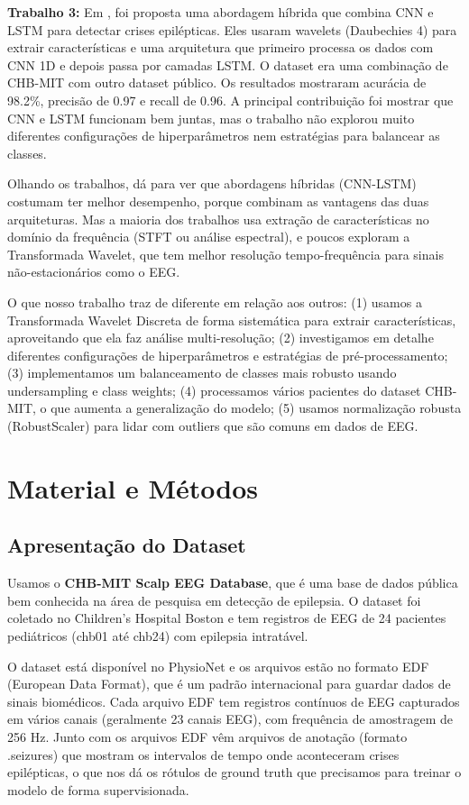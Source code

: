 \documentclass[12pt,a4paper]{article}
\begin{document}
\textbf{Trabalho 3:} Em \cite{sharma2022}, foi proposta uma abordagem híbrida que combina CNN e LSTM para detectar crises epilépticas. Eles usaram wavelets (Daubechies 4) para extrair características e uma arquitetura que primeiro processa os dados com CNN 1D e depois passa por camadas LSTM. O dataset era uma combinação de CHB-MIT com outro dataset público. Os resultados mostraram acurácia de 98.2\%, precisão de 0.97 e recall de 0.96. A principal contribuição foi mostrar que CNN e LSTM funcionam bem juntas, mas o trabalho não explorou muito diferentes configurações de hiperparâmetros nem estratégias para balancear as classes.

Olhando os trabalhos, dá para ver que abordagens híbridas (CNN-LSTM) costumam ter melhor desempenho, porque combinam as vantagens das duas arquiteturas. Mas a maioria dos trabalhos usa extração de características no domínio da frequência (STFT ou análise espectral), e poucos exploram a Transformada Wavelet, que tem melhor resolução tempo-frequência para sinais não-estacionários como o EEG.

O que nosso trabalho traz de diferente em relação aos outros: (1) usamos a Transformada Wavelet Discreta de forma sistemática para extrair características, aproveitando que ela faz análise multi-resolução; (2) investigamos em detalhe diferentes configurações de hiperparâmetros e estratégias de pré-processamento; (3) implementamos um balanceamento de classes mais robusto usando undersampling e class weights; (4) processamos vários pacientes do dataset CHB-MIT, o que aumenta a generalização do modelo; (5) usamos normalização robusta (RobustScaler) para lidar com outliers que são comuns em dados de EEG.

\section{Material e Métodos}

\subsection{Apresentação do Dataset}

Usamos o \textbf{CHB-MIT Scalp EEG Database}, que é uma base de dados pública bem conhecida na área de pesquisa em detecção de epilepsia. O dataset foi coletado no Children's Hospital Boston e tem registros de EEG de 24 pacientes pediátricos (chb01 até chb24) com epilepsia intratável.

O dataset está disponível no PhysioNet \cite{goldberger2000} e os arquivos estão no formato EDF (European Data Format), que é um padrão internacional para guardar dados de sinais biomédicos. Cada arquivo EDF tem registros contínuos de EEG capturados em vários canais (geralmente 23 canais EEG), com frequência de amostragem de 256 Hz. Junto com os arquivos EDF vêm arquivos de anotação (formato .seizures) que mostram os intervalos de tempo onde aconteceram crises epilépticas, o que nos dá os rótulos de ground truth que precisamos para treinar o modelo de forma supervisionada.
\end{document}

